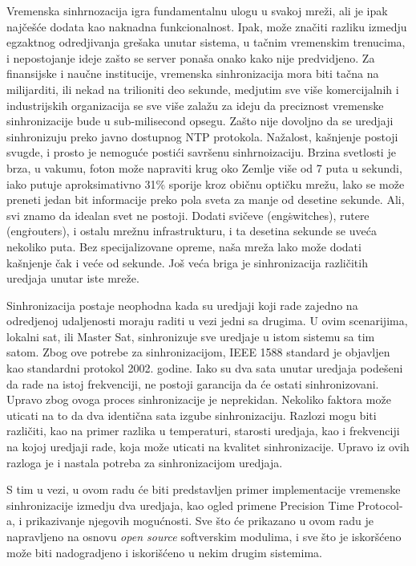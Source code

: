 \documentclass[a4paper,12pt, master]{etf}
\begin{document}
	Vremenska sinhrnozacija igra fundamentalnu ulogu u svakoj mre\v{z}i, ali je
	ipak naj\v{c}e\v{s}\'{c}e dodata kao naknadna funkcionalnost. Ipak,
	mo\v{z}e zna\v{c}iti razliku izmedju egzaktnog odredjivanja gre\v{s}aka
	unutar sistema, u ta\v{c}nim vremenskim trenucima, i nepostojanje ideje
	za\v{s}to se server pona\v{s}a onako kako nije predvidjeno. Za finansijske 
	i nau\v{c}ne institucije, vremenska sinhronizacija mora biti ta\v{c}na na 
	milijarditi, ili nekad na trilioniti deo sekunde, medjutim sve vi\v{s}e 
	komercijalnih i industrijskih organizacija se sve vi\v{s}e zala\v{z}u za 
	ideju da preciznost vremenske sinhronizacije bude u sub-milisecond opsegu. 
	Za\v{s}to nije dovoljno da se uredjaji sinhronizuju preko javno dostupnog 
	NTP protokola. Na\v{z}alost, ka\v{s}njenje postoji svugde, i prosto je 
	nemogu\'{c}e posti\'{c}i savr\v{s}enu sinhrnoizaciju. Brzina svetlosti je 
	brza, u vakumu, foton mo\v{z}e napraviti krug oko Zemlje vi\v{s}e od 7 puta 
	u sekundi, iako putuje aproksimativno 31\% sporije kroz obi\v{c}nu 
	opti\v{c}ku mre\v{z}u, lako se mo\v{z}e preneti jedan bit informacije preko 
	pola sveta za manje od desetine sekunde. Ali, svi znamo da idealan svet ne 
	postoji. Dodati svi\v{c}eve (eng\. switches), rutere (eng\. routers), i 
	ostalu mre\v{z}nu infrastrukturu, i ta desetina sekunde se uve\'{c}a 
	nekoliko puta. Bez specijalizovane opreme, na\v{s}a mre\v{z}a lako mo\v{z}e 
	dodati ka\v{s}njenje \v{c}ak i ve\'{c}e od sekunde. Jo\v{s} ve\'{c}a briga 
	je sinhronizacija razli\v{c}itih uredjaja unutar iste mre\v{z}e.

	Sinhronizacija postaje neophodna kada su uredjaji koji rade zajedno na
	odredjenoj udaljenosti moraju raditi u vezi jedni sa drugima. U ovim
	scenarijima, lokalni sat, ili Master Sat, sinhronizuje sve uredjaje u istom
	sistemu sa tim satom. Zbog ove potrebe za sinhronizacijom, IEEE 1588
	standard je objavljen kao standardni protokol 2002. godine. Iako su dva
	sata unutar uredjaja pode\v{s}eni da rade na istoj frekvenciji, ne postoji
	garancija da \'{c}e ostati sinhronizovani. Upravo zbog ovoga proces
	sinhronizacije je neprekidan. Nekoliko faktora mo\v{z}e uticati na to da
	dva identi\v{c}na sata izgube sinhronizaciju. Razlozi mogu biti
	razli\v{c}iti, kao na primer razlika u temperaturi, starosti uredjaja, kao
	i frekvenciji na kojoj uredjaji rade, koja mo\v{z}e uticati na kvalitet
	sinhronizacije. Upravo iz ovih razloga je i	nastala potreba za
	sinhronizacijom uredjaja.

	S tim u vezi, u ovom radu \'{c}e biti predstavljen primer implementacije 
	vremenske sinhronizacije izmedju dva uredjaja, kao ogled primene Precision 
	Time Protocol-a, i prikazivanje njegovih mogu\'{c}nosti. Sve \v{s}to \'{c}e 
	prikazano u ovom radu je napravljeno na osnovu \textit{open source} 
	softverskim modulima, i sve \v{s}to je iskor\v{s}\'{c}eno mo\v{z}e biti 
	nadogradjeno i iskori\v{s}\'{c}eno u nekim drugim sistemima.
\end{document}
